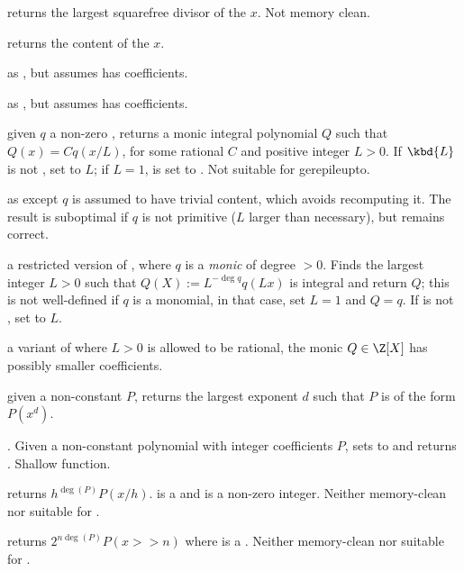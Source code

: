  returns the largest squarefree divisor
of the  $x$. Not memory clean.

 returns the content of the  $x$.

 as , but assumes  has 
coefficients.

 as , but assumes
 has  coefficients.

 given $q$ a non-zero ,
returns a monic integral polynomial $Q$ such that $Q(x) = C q(x/L)$, for some
rational $C$ and positive integer $L > 0$. If $\kbd{L}$ is not ,
set  to $L$; if $L = 1$,  is set to . Not
suitable for gerepileupto.

 as  except
$q$ is assumed to have trivial content, which avoids recomputing it.
The result is suboptimal if $q$ is not primitive ($L$ larger than
necessary), but remains correct.

 a restricted version of
, where $q$ is a \emph{monic} 
of degree $> 0$. Finds the largest integer $L > 0$ such that
$Q(X) := L^{-\deg q} q(Lx)$ is integral and return $Q$; this is not
well-defined if $q$ is a monomial, in that case, set $L=1$ and $Q = q$. If
 is not , set  to $L$.

 a variant of 
where $L > 0$ is allowed to be rational, the monic $Q\in \Z[X]$ has possibly
smaller coefficients.

 given a non-constant 
$P$, returns the largest exponent $d$ such that $P$ is of the form $P(x^d)$.

. Given a non-constant
polynomial with integer coefficients $P$, sets  to
 and returns . Shallow
function.

 returns $h^{\deg(P)} P(x/h)$.
 is a  and  is a non-zero integer. Neither memory-clean
nor suitable for .

 returns $2^{n\deg(P)} P(x>>n)$ where
 is a . Neither memory-clean nor suitable for
.

